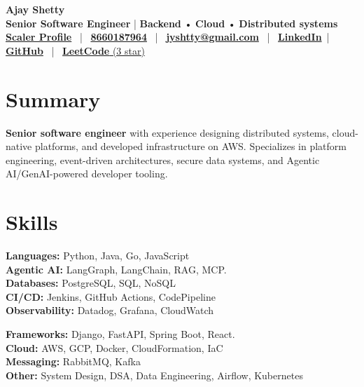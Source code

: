 \documentclass[11 pt]{article}
\begin{document}
\begin{center}
    {\LARGE \textbf{Ajay Shetty}} \\[4pt]
    \textbf{Senior Software Engineer} | \textbf{Backend} • \textbf{Cloud} • \textbf{ Distributed systems} \\[6pt]

    \href{https://www.scaler.com/academy/profile/e30cd4a603ce/}{\textbf{Scaler Profile}} \, | \,
    \href{tel:8660187964}{\textbf{8660187964}} \, | \,
    \href{mailto:jyshtty@gmail.com}{\textbf{jyshtty@gmail.com}} \, | \,
    \href{https://www.linkedin.com/in/ajay-shetty-2b5901ab/}{\textbf{LinkedIn}} \,|\,
    \href{https://github.com/jyshtty}{\textbf{GitHub}} \, | \,
    \href{https://leetcode.com/u/jyshtty/}{\textbf{LeetCode} (3 star)}
\end{center}

\section*{\textbf{Summary}}
\textbf{Senior software engineer}  with experience designing distributed systems, cloud-native platforms, and developed infrastructure on AWS. Specializes in platform engineering, event-driven architectures, secure data systems, and Agentic AI/GenAI-powered developer tooling.



\section*{\textbf{Skills}}

\noindent
\begin{minipage}[t]{0.48\textwidth}
\textbf{Languages:} Python, Java, Go, JavaScript \\[1pt]
\textbf{Agentic AI:} LangGraph, LangChain, RAG, MCP. \\[1pt]
\textbf{Databases:} PostgreSQL, SQL, NoSQL \\[1pt]
\textbf{CI/CD:} Jenkins, GitHub Actions, CodePipeline \\[1pt]
\textbf{Observability:} Datadog, Grafana, CloudWatch
\end{minipage}
\hfill
\begin{minipage}[t]{0.48\textwidth}
\textbf{Frameworks:} Django, FastAPI, Spring Boot, React.  \\[1pt]
\textbf{Cloud:} AWS, GCP, Docker, CloudFormation, IaC \\[1pt]
\textbf{Messaging:} RabbitMQ, Kafka \\[1pt]
\textbf{Other:} System Design, DSA, Data Engineering, Airflow, Kubernetes
\end{minipage}
\end{document}
